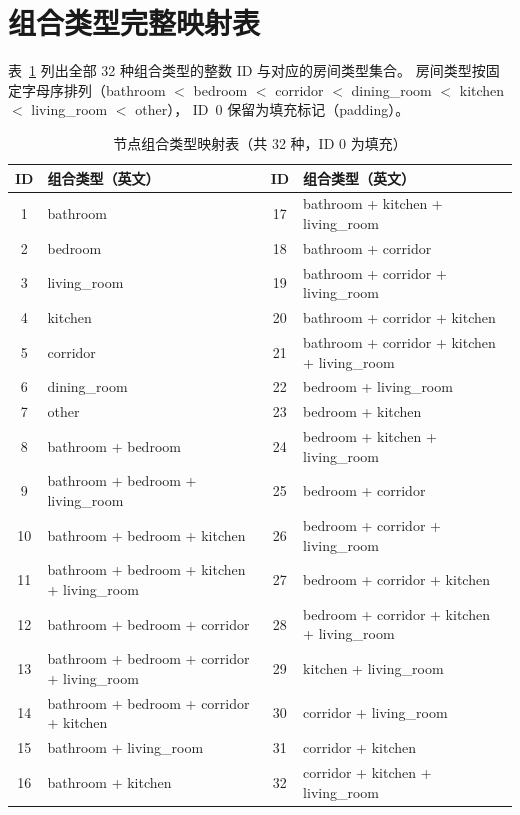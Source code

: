 \appendix

\section{组合类型完整映射表}
\label{sec:appendix_combo}

表~\ref{tab:combo_types} 列出全部 32 种组合类型的整数 ID 与对应的房间类型集合。
房间类型按固定字母序排列（bathroom $<$ bedroom $<$ corridor $<$ dining\_room $<$ kitchen $<$ living\_room $<$ other），
ID~0 保留为填充标记（padding）。

\begin{table}[H]
\centering
\caption{节点组合类型映射表（共 32 种，ID 0 为填充）}
\label{tab:combo_types}
\small
\begin{tabular}{clcl}
\toprule
\textbf{ID} & \textbf{组合类型（英文）} & \textbf{ID} & \textbf{组合类型（英文）} \\
\midrule
1  & bathroom                                        & 17 & bathroom + kitchen + living\_room \\
2  & bedroom                                         & 18 & bathroom + corridor \\
3  & living\_room                                    & 19 & bathroom + corridor + living\_room \\
4  & kitchen                                         & 20 & bathroom + corridor + kitchen \\
5  & corridor                                        & 21 & bathroom + corridor + kitchen + living\_room \\
6  & dining\_room                                    & 22 & bedroom + living\_room \\
7  & other                                           & 23 & bedroom + kitchen \\
8  & bathroom + bedroom                              & 24 & bedroom + kitchen + living\_room \\
9  & bathroom + bedroom + living\_room               & 25 & bedroom + corridor \\
10 & bathroom + bedroom + kitchen                    & 26 & bedroom + corridor + living\_room \\
11 & bathroom + bedroom + kitchen + living\_room     & 27 & bedroom + corridor + kitchen \\
12 & bathroom + bedroom + corridor                   & 28 & bedroom + corridor + kitchen + living\_room \\
13 & bathroom + bedroom + corridor + living\_room    & 29 & kitchen + living\_room \\
14 & bathroom + bedroom + corridor + kitchen         & 30 & corridor + living\_room \\
15 & bathroom + living\_room                         & 31 & corridor + kitchen \\
16 & bathroom + kitchen                              & 32 & corridor + kitchen + living\_room \\
\bottomrule
\end{tabular}
\end{table}
